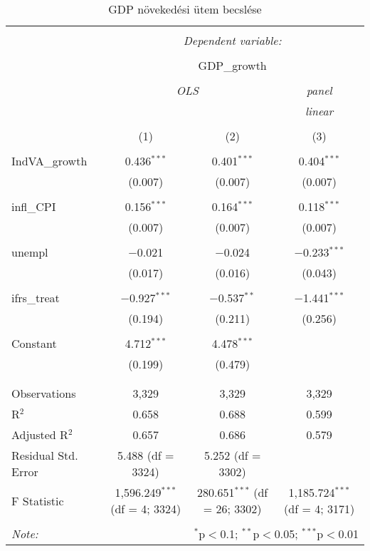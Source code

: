 
\begin{table}[!htbp] \centering 
  \caption{GDP növekedési ütem becslése} 
  \label{} 
\begin{tabular}{@{\extracolsep{5pt}}lccc} 
\\[-1.8ex]\hline 
\hline \\[-1.8ex] 
 & \multicolumn{3}{c}{\textit{Dependent variable:}} \\ 
\cline{2-4} 
\\[-1.8ex] & \multicolumn{3}{c}{GDP\_growth} \\ 
\\[-1.8ex] & \multicolumn{2}{c}{\textit{OLS}} & \textit{panel} \\ 
 & \multicolumn{2}{c}{\textit{}} & \textit{linear} \\ 
\\[-1.8ex] & (1) & (2) & (3)\\ 
\hline \\[-1.8ex] 
 IndVA\_growth & 0.436$^{***}$ & 0.401$^{***}$ & 0.404$^{***}$ \\ 
  & (0.007) & (0.007) & (0.007) \\ 
  & & & \\ 
 infl\_CPI & 0.156$^{***}$ & 0.164$^{***}$ & 0.118$^{***}$ \\ 
  & (0.007) & (0.007) & (0.007) \\ 
  & & & \\ 
 unempl & $-$0.021 & $-$0.024 & $-$0.233$^{***}$ \\ 
  & (0.017) & (0.016) & (0.043) \\ 
  & & & \\ 
 ifrs\_treat & $-$0.927$^{***}$ & $-$0.537$^{**}$ & $-$1.441$^{***}$ \\ 
  & (0.194) & (0.211) & (0.256) \\ 
  & & & \\ 
 Constant & 4.712$^{***}$ & 4.478$^{***}$ &  \\ 
  & (0.199) & (0.479) &  \\ 
  & & & \\ 
\hline \\[-1.8ex] 
Observations & 3,329 & 3,329 & 3,329 \\ 
R$^{2}$ & 0.658 & 0.688 & 0.599 \\ 
Adjusted R$^{2}$ & 0.657 & 0.686 & 0.579 \\ 
Residual Std. Error & 5.488 (df = 3324) & 5.252 (df = 3302) &  \\ 
F Statistic & 1,596.249$^{***}$ (df = 4; 3324) & 280.651$^{***}$ (df = 26; 3302) & 1,185.724$^{***}$ (df = 4; 3171) \\ 
\hline 
\hline \\[-1.8ex] 
\textit{Note:}  & \multicolumn{3}{r}{$^{*}$p$<$0.1; $^{**}$p$<$0.05; $^{***}$p$<$0.01} \\ 
\end{tabular} 
\end{table} 
